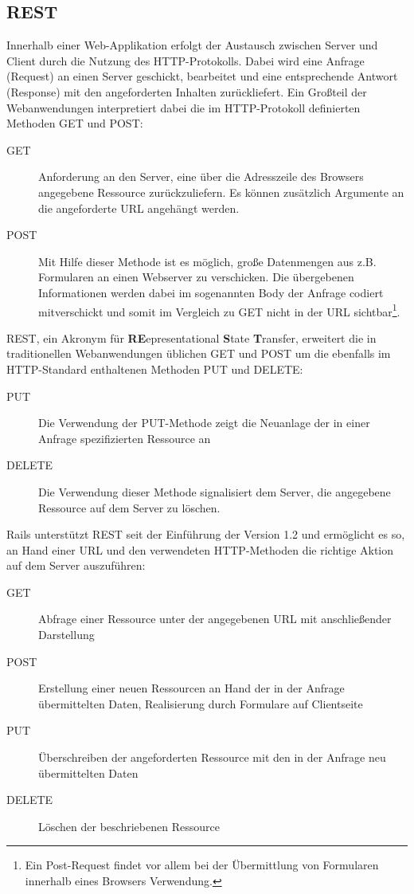 \subsection{REST}
Innerhalb einer Web-Applikation erfolgt der Austausch zwischen Server und Client durch die Nutzung des HTTP-Protokolls. Dabei wird eine Anfrage (Request) an einen Server geschickt, bearbeitet und eine entsprechende Antwort (Response) mit den angeforderten Inhalten zurückliefert. Ein Großteil der Webanwendungen interpretiert dabei die im HTTP-Protokoll definierten Methoden GET und POST:

\begin{description}
\item[GET]
	Anforderung an den Server, eine über die Adresszeile des Browsers angegebene Ressource zurückzuliefern. Es können zusätzlich Argumente an die angeforderte URL angehängt werden.
\item[POST]
	Mit Hilfe dieser Methode ist es möglich,  große Datenmengen aus z.B. Formularen an einen Webserver zu verschicken. Die übergebenen Informationen werden dabei im sogenannten Body der Anfrage codiert mitverschickt und somit im Vergleich zu GET nicht in der URL sichtbar\footnote{Ein Post-Request findet vor allem bei der Übermittlung von Formularen innerhalb eines Browsers Verwendung.}.
\end{description}


REST, ein Akronym für \textbf{RE}epresentational \textbf{S}tate \textbf{T}ransfer, erweitert die in  traditionellen Webanwendungen üblichen GET und POST um die ebenfalls im HTTP-Standard enthaltenen Methoden PUT und DELETE:

\begin{description}
\item[PUT]
	Die Verwendung der PUT-Methode zeigt die Neuanlage der in einer	Anfrage spezifizierten Ressource an
\item[DELETE]
	Die Verwendung dieser Methode signalisiert dem Server, die angegebene Ressource auf dem Server zu löschen.
\end{description}


Rails unterstützt REST seit der Einführung der Version 1.2 und ermöglicht es so, an Hand einer URL und den verwendeten HTTP-Methoden die richtige Aktion auf dem Server auszuführen:

\begin{description}
\item[GET]
Abfrage einer Ressource unter der angegebenen URL mit  anschließender Darstellung
\item[POST]
Erstellung einer neuen Ressourcen an Hand der in der Anfrage übermittelten Daten, Realisierung durch Formulare auf Clientseite
\item[PUT]
Überschreiben der angeforderten Ressource mit den in der Anfrage neu übermittelten Daten
\item[DELETE]
Löschen der beschriebenen Ressource
\end{description}


